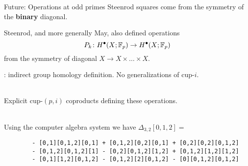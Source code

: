 
\begin{frame}[fragile]{Future: Operations at odd primes}
	\pause
	Steenrod squares come from the symmetry of the \textbf{binary} diagonal.

	\medskip\pause
	Steenrod, and more generally May, also defined operations
	\[
	P_k \colon H^\bullet(X; {\mathbb{F}_p}) \to H^\bullet(X; {\mathbb{F}_p})
	\]
	from the symmetry of diagonal $X \to X \times \dots \times X$.

	\medskip\pause
	: indirect group homology definition.
	No generalizations of cup-$i$.

	\bigskip\pause
	 \\
	Explicit cup-$(p,i)$ coproducts defining these operations.

	\medskip\pause
	 \\
	Using the computer algebra system  we have $\Delta_{3,2}[0,1,2] = $

	\begin{verbatim}
		- [0,1][0,1,2][0,1] + [0,1,2][0,2][0,1] + [0,2][0,2][0,1,2]
		- [0,1,2][0,1,2][1] - [0,2][0,1,2][1,2] + [0,1,2][1,2][1,2]
		- [0,1][1,2][0,1,2] - [0,1,2][2][0,1,2] - [0][0,1,2][0,1,2]
	\end{verbatim}
\end{frame}

